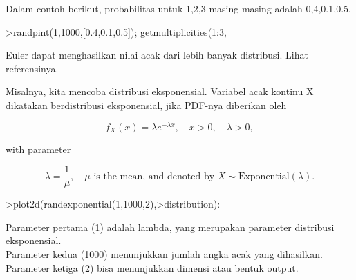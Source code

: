 \documentclass{article}
\begin{document}
\begin{eulernotebook}
\begin{eulercomment}
\begin{eulercomment}
\begin{eulercomment}
Dalam contoh berikut, probabilitas untuk 1,2,3 masing-masing adalah
0,4,0.1,0.5.
\end{eulercomment}
\begin{eulerprompt}
>randpint(1,1000,[0.4,0.1,0.5]); getmultiplicities(1:3,%
\end{eulerprompt}
\begin{euleroutput}
  [378,  102,  520]
\end{euleroutput}
\begin{eulercomment}
Euler dapat menghasilkan nilai acak dari lebih banyak distribusi.
Lihat referensinya.

Misalnya, kita mencoba distribusi eksponensial. Variabel acak kontinu
X dikatakan berdistribusi eksponensial, jika PDF-nya diberikan oleh

\end{eulercomment}
\begin{eulerformula}
\[
f_X(x)=\lambda e^{-\lambda x},\quad x>0,\quad \lambda>0,
\]
\end{eulerformula}
\begin{eulercomment}
with parameter\\
\end{eulercomment}
\begin{eulerformula}
\[
\lambda=\frac{1}{\mu},\quad \mu \text{ is the mean, and denoted by } X \sim \text{Exponential}(\lambda).
\]
\end{eulerformula}
\begin{eulerprompt}
>plot2d(randexponential(1,1000,2),>distribution):
\end{eulerprompt}
\begin{eulercomment}
Parameter pertama (1) adalah lambda, yang merupakan parameter
distribusi eksponensial.\\
Parameter kedua (1000) menunjukkan jumlah angka acak yang dihasilkan.\\
Parameter ketiga (2) bisa menunjukkan dimensi atau bentuk output.


\end{eulercomment}
\end{eulercomment}
\end{eulercomment}
\end{eulernotebook}
\end{document}
